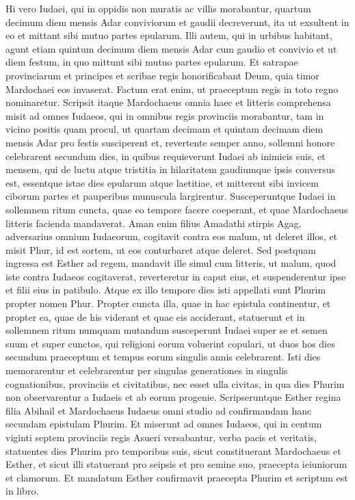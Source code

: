 \begin{biblechapter}
\begin{biblechapter}
\begin{biblechapter}
\begin{biblechapter}
\begin{biblechapter}
\begin{biblechapter}
\begin{biblechapter}
\begin{biblechapter}
\begin{biblechapter}
\verse Hi vero Iudaei, qui in oppidis non muratis ac villis morabantur, quartum decimum diem mensis Adar conviviorum et gaudii decreverunt, ita ut exsultent in eo et mittant sibi mutuo partes epularum. Illi autem, qui in urbibus habitant, agunt etiam quintum decimum diem mensis Adar cum gaudio et convivio et ut diem festum, in quo mittunt sibi mutuo partes epularum.
 \versea Et satrapae provinciarum et principes et scribae regis honorificabant Deum, quia timor Mardochaei eos invaserat. Factum erat enim, ut praeceptum regis in toto regno nominaretur.
 \verse Scripsit itaque Mardochaeus omnia haec et litteris comprehensa misit ad omnes Iudaeos, qui in omnibus regis provinciis morabantur, tam in vicino positis quam procul, 
\verse ut quartam decimam et quintam decimam diem mensis Adar pro festis susciperent et, revertente semper anno, sollemni honore celebrarent 
\verse secundum dies, in quibus requieverunt Iudaei ab inimicis suis, et mensem, qui de luctu atque tristitia in hilaritatem gaudiumque ipsis conversus est, essentque istae dies epularum atque laetitiae, et mitterent sibi invicem ciborum partes et pauperibus munuscula largirentur.
 \verse Susceperuntque Iudaei in sollemnem ritum cuncta, quae eo tempore facere coeperant, et quae Mardochaeus litteris facienda mandaverat. 
\verse Aman enim filius Amadathi stirpis Agag, adversarius omnium Iudaeorum, cogitavit contra eos malum, ut deleret illos, et misit Phur, id est sortem, ut eos conturbaret atque deleret. 
\verse Sed postquam ingressa est Esther ad regem, mandavit ille simul cum litteris, ut malum, quod iste contra Iudaeos cogitaverat, reverteretur in caput eius, et suspenderentur ipse et filii eius in patibulo. 
\verse Atque ex illo tempore dies isti appellati sunt Phurim propter nomen Phur. Propter cuncta illa, quae in hac epistula continentur, 
\verse et propter ea, quae de his viderant et quae eis acciderant, statuerunt et in sollemnem ritum numquam mutandum susceperunt Iudaei super se et semen suum et super cunctos, qui religioni eorum voluerint copulari, ut duos hos dies secundum praeceptum et tempus eorum singulis annis celebrarent. 
\verse Isti dies memorarentur et celebrarentur per singulas generationes in singulis cognationibus, provinciis et civitatibus, nec esset ulla civitas, in qua dies Phurim non observarentur a Iudaeis et ab eorum progenie.
 \verse Scripseruntque Esther regina filia Abihail et Mardochaeus Iudaeus omni studio ad confirmandam hanc secundam epistulam Phurim. 
\verse Et miserunt ad omnes Iudaeos, qui in centum viginti septem provinciis regis Asueri versabantur, verba pacis et veritatis, 
\verse statuentes dies Phurim pro temporibus suis, sicut constituerant Mardochaeus et Esther, et sicut illi statuerant pro seipsis et pro semine suo, praecepta ieiuniorum et clamorum. 
\verse Et mandatum Esther confirmavit praecepta Phurim et scriptum est in libro.
 

\end{biblechapter}
\end{biblechapter}
\end{biblechapter}
\end{biblechapter}
\end{biblechapter}
\end{biblechapter}
\end{biblechapter}
\end{biblechapter}
\end{biblechapter}

